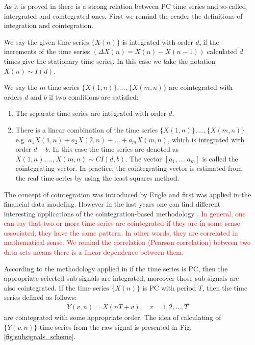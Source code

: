 \documentclass[preprint]{elsarticle}
\begin{document}
As it is proved in \cite{broszkiewiczperiodic} there is a strong relation between PC time series and so-called intergrated and cointegrated ones. First we remind the reader the definitions of integration and cointegration. 

We say the given time series $\{X(n)\}$ is integrated with order $d$, if the increments of the time series $\left(\Delta X(n)=X(n)-X(n-1)\right)$ calculated $d$ times give the stationary time series. In this case we take the notation $X(n) \sim I(d)$.

We say the $m$ time series $\{X(1,n)\},…,\{X(m,n)\}$ are cointegrated with orders $d$ and $b$ if two conditions are satisfied:
\begin{enumerate}
\item The separate time series are integrated with order $d$.
\item 	There is a linear combination of the time series $\{X(1,n)\},\dots,\{X(m,n)\}$ e.g. $a_1 X(1,n)+a_2 X(2,n)+ \dots+a_m X(m,n)$,  which is integrated with order $d-b$. In this case the time series are denoted as ${X(1,n)},\dots,{X(m,n)}\sim CI(d,b)$. The vector $[a_1,\dots,a_m]$ is called the cointegrating vector. In practice, the  cointegrating vector is estimated from the real time series by using the least squares method.
\end{enumerate}

The concept of cointegration was introduced by Engle \cite{engle1987co} and first was applied in the financial data modeling. However in the last years one can find different interesting applications of the cointegration-based methodology \cite{tabrizi2016cointegration,worden2014multiresolution}. \textcolor{red}{In general, one can say that two or more time series are cointegrated if they are in some sense associated, they have the same pattern. In other words, they are correlated in mathematical sense. We remind the correlation (Pearson correlation) between two data sets means there is a linear dependence between them. }

According to the methodology applied in \cite{broszkiewiczperiodic} if the time series is PC, then  the appropriate selected sub-signals are integrated, moreover those sub-signals are also cointegrated. 
If the time series $\{X(n)\}$ is PC with period $T$, then the time series defined as follows:
\begin{equation}
\label{eq:subsignals}
\begin{gathered}
Y(v,n)=X(nT+v), \quad v=1,2,\dots,T
\end{gathered}
\end{equation}
are cointegrated with some appropriate order. The idea of calculating of $\{Y(v,n)\}$ time series from the raw signal is presented in Fig. \ref{fig:subsignals_scheme}.
\end{document}
